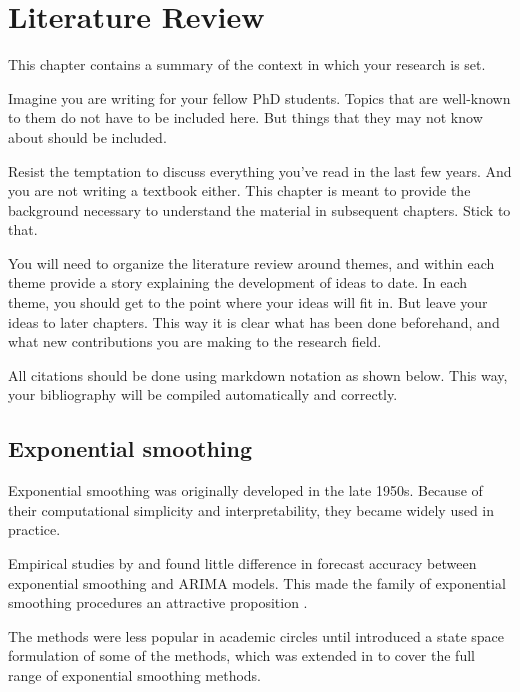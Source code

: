 \documentclass[oneside,12pt,a4paper,bibliography=totocnumbered,numbers=noenddot,table]{scrreprt} %
\begin{document}
\hypertarget{ch:litreview}{%
\chapter{Literature Review}\label{ch:litreview}}

This chapter contains a summary of the context in which your research is set.

Imagine you are writing for your fellow PhD students. Topics that are well-known to them do not have to be included here. But things that they may not know about should be included.

Resist the temptation to discuss everything you've read in the last few years. And you are not writing a textbook either. This chapter is meant to provide the background necessary to understand the material in subsequent chapters. Stick to that.

You will need to organize the literature review around themes, and within each theme provide a story explaining the development of ideas to date. In each theme, you should get to the point where your ideas will fit in. But leave your ideas to later chapters. This way it is clear what has been done beforehand, and what new contributions you are making to the research field.

All citations should be done using markdown notation as shown below. This way, your bibliography will be compiled automatically and correctly.

\hypertarget{sec:expsmooth}{%
\section{Exponential smoothing}\label{sec:expsmooth}}

Exponential smoothing was originally developed in the late 1950s. Because of their computational simplicity and interpretability, they became widely used in practice.

Empirical studies by \textcite{MH79} and \textcite{Metal82} found little difference in forecast accuracy between exponential smoothing and ARIMA models. This made the family of exponential smoothing procedures an attractive proposition .

The methods were less popular in academic circles until \textcite{OKS97} introduced a state space formulation of some of the methods, which was extended in \textcite{HKSG02} to cover the full range of exponential smoothing methods.

\hypertarget{appendix-appendix}{%
\appendix}
\end{document}
